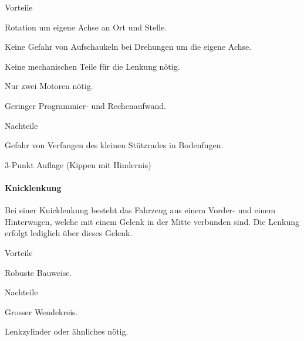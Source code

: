 \documentclass[../main.tex]{subfiles}
\begin{document}
\begin{minipage}[t]{0.48\textwidth}
    \begin{items}
        \item[Vorteile]
        \item Rotation um eigene Achse an Ort und Stelle.
        \item Keine Gefahr von Aufschaukeln bei Drehungen um die eigene Achse.
        \item Keine mechanischen Teile für die Lenkung nötig.
        \item Nur zwei Motoren nötig.
         \item Geringer Programmier- und Rechenaufwand.
    \end{items}
\end{minipage}
\begin{minipage}[t]{0.48\textwidth}
    \begin{items}
      \item [Nachteile]
      \item Gefahr von Verfangen des kleinen Stützrades in Bodenfugen.
      \item 3-Punkt Auflage (Kippen mit Hindernis)
    \end{items}
\end{minipage}

\paragraph{Knicklenkung} \label{recherche-knicklenkung}

Bei einer Knicklenkung besteht das Fahrzeug aus einem Vorder- und einem Hinterwagen, welche mit einem Gelenk in der Mitte verbunden sind. Die Lenkung erfolgt lediglich über dieses Gelenk.

\begin{minipage}[t]{0.48\textwidth}
    \begin{items}
      \item [Vorteile]
      \item Robuste Bauweise.
 \end{items}
\end{minipage}
\hfill
\begin{minipage}[t]{0.48\textwidth}
    \begin{items}
      \item [Nachteile]
      \item Grosser Wendekreis.
      \item Lenkzylinder oder ähnliches nötig.
    \end{items}
\end{minipage}
\end{document}
